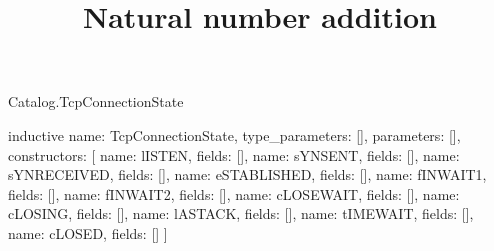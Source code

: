 \begin{lexlean}{Catalog.TcpConnectionState}
\title{Natural number addition}
\begin{semanticmodule}
inductive{
  name: TcpConnectionState,
  type_parameters: [],
  parameters: [],
  constructors: [
    {name: lISTEN, fields: []},
    {name: sYNSENT, fields: []},
    {name: sYNRECEIVED, fields: []},
    {name: eSTABLISHED, fields: []},
    {name: fINWAIT1, fields: []},
    {name: fINWAIT2, fields: []},
    {name: cLOSEWAIT, fields: []},
    {name: cLOSING, fields: []},
    {name: lASTACK, fields: []},
    {name: tIMEWAIT, fields: []},
    {name: cLOSED, fields: []}
  ]
}
\end{semanticmodule}
\end{lexlean}

